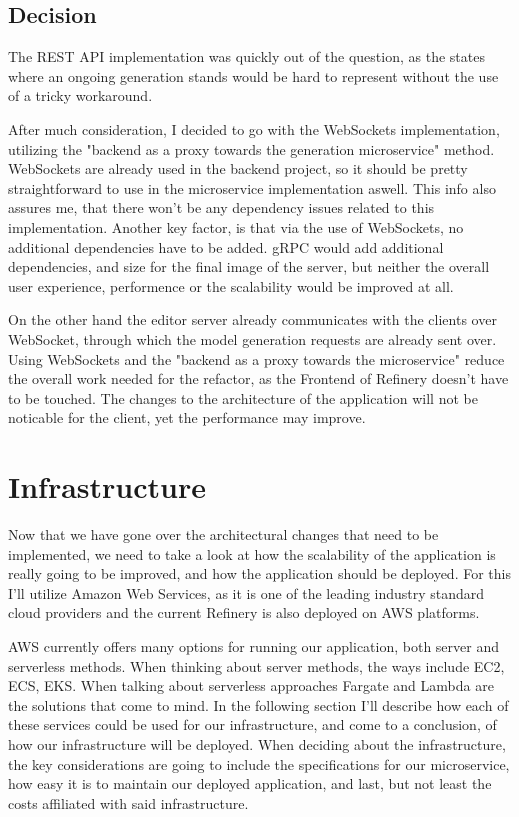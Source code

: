 \subsection{Decision}
	The REST API implementation was quickly out of the question, as the states where an ongoing generation stands would be hard to represent
	 without the use of a tricky workaround.

	After much consideration, I decided to go with the WebSockets implementation, utilizing the "backend as a proxy towards the generation microservice" method.
	WebSockets are already used in the backend project, so it should be pretty straightforward to use in the microservice implementation aswell.
	This info also assures me, that there won't be any dependency issues related to this implementation. Another key factor, is that via the use of 
	WebSockets, no additional dependencies have to be added. gRPC would add additional dependencies, and size for the final image of the server,
	but neither the overall user experience, performence or the scalability would be improved at all.

	On the other hand the editor server already communicates with the clients over WebSocket, through which
	the model generation requests are already sent over. Using WebSockets and the "backend as a proxy towards the microservice" reduce the overall work needed for the refactor, 
	as the Frontend of Refinery 
	doesn't have to be touched. The changes to the architecture of the application will not be noticable for the client, yet the performance may improve.

\section{Infrastructure}

	Now that we have gone over the architectural changes that need to be implemented, we need to take a look at how the 
	scalability of the application is really going to be improved, and how the application should be deployed.
	For this I'll utilize Amazon Web Services, as it is one of the leading industry standard cloud providers
	and the current Refinery is also deployed on AWS platforms.

	AWS currently offers many options for running our application, both server and serverless methods.
	When thinking about server methods, the ways include EC2, ECS, EKS. When talking about serverless approaches
	Fargate and Lambda are the solutions that come to mind. In the following section I'll describe how each of these
	services could be used for our infrastructure, and come to a conclusion, of how our infrastructure will be deployed.
	When deciding about the infrastructure, the key considerations are going to include the specifications for our microservice,
	how easy it is to maintain our deployed application, and last, but not least the costs affiliated with said infrastructure.


